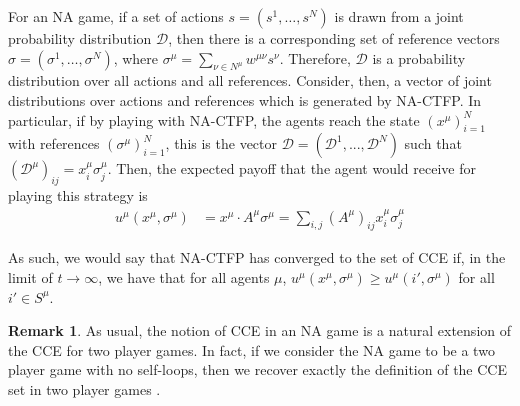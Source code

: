 \documentclass{article}
\theoremstyle{definition}
\newtheorem*{remark}{Remark}
\newcommand{\wmunu}{w^{\mu \nu}}
\newcommand{\xmu}{x^{\mu}}
\newcommand{\refmu}{\sigma^{\mu}}
\begin{document}
  For an NA game, if a set of actions $s = (s^1, \ldots, s^N)$ is
  drawn from a joint probability distribution $\mathcal{D}$, then
  there is a corresponding set of reference vectors $\sigma =
  (\sigma^1, \ldots, \sigma^N)$, where $\sigma^\mu = \sum_{\nu \in
    N^\mu} \wmunu s^\nu$.  Therefore, $\mathcal{D}$ is a probability
  distribution over all actions and all references.  Consider, then, a
  vector of joint distributions over actions and references which is
  generated by NA-CTFP. In particular, if by playing with NA-CTFP, the
  agents reach the state $(\xmu)_{i = 1}^N$ with references
  $(\refmu)_{i = 1}^N$, this is the vector $\mathcal{D} =
  (\mathcal{D}^1, ..., \mathcal{D}^N)$ such that
  $(\mathcal{D}^\mu)_{ij} = \xmu_i \refmu_j$. Then, the expected
  payoff that the agent would receive for playing this strategy is
%
  \begin{align*}
    u^\mu(\xmu, \refmu) & = \xmu \cdot A^\mu \refmu = \sum_{i, j} (A^\mu)_{ij} \xmu_i \refmu_j \nonumber 
  \end{align*}

  As such, we would say that NA-CTFP has converged to the set of CCE if, in the limit of $t
  \rightarrow \infty$, we have that for all agents $\mu$,
  $u^\mu (\xmu, \refmu) \geq u^\mu(i', \refmu)$
  for all $i' \in S^\mu$.

  \begin{remark}
    As usual, the notion of CCE in an NA game is a natural extension of the CCE for two player
    games. In fact, if we consider the NA game to be a two player game with no self-loops, then
    we recover exactly the definition of the CCE set in two player games \cite{Ostrovski2014}.
  \end{remark}
\end{document}
